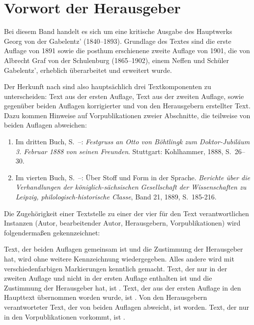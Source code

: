 \chapter*{Vorwort der Herausgeber}

Bei diesem Band handelt es sich um eine kritische Ausgabe des Hauptwerks Georg von der Gabelentz' (1840–1893). Grundlage des Textes sind die erste Auflage von 1891 sowie die posthum erschienene zweite Auflage von 1901, die von Albrecht Graf von der Schulenburg (1865–1902), einem Neffen und Schüler Gabelentz', erheblich überarbeitet und erweitert wurde. 

Der Herkunft nach sind also hauptsächlich drei Textkomponenten zu unterscheiden: Text aus der ersten Auflage, Text aus der zweiten Auflage, sowie gegenüber beiden Auflagen korrigierter und von den Herausgebern erstellter Text. Dazu kommen Hinweise auf Vorpublikationen zweier Abschnitte, die teilweise von beiden Auflagen abweichen:

\begin{enumerate}[1.]
\item Im dritten Buch, S.~\pageref{III.II.II.8}–\pageref{III.II.II.9}: \textit{Festgruss an Otto von Böhtlingk zum Doktor-Jubiläum 3. Februar 1888 von seinen Freunden}. Stuttgart: Kohlhammer, 1888, S.~26–30.
\item Im vierten Buch, S.~\pageref{IV.III.II.1}–\pageref{IV.III.III}: Über Stoff und Form in der Sprache. \textit{Berichte über die Verhandlungen der königlich-sächsischen Gesellschaft der Wissenschaften zu Leipzig, philologisch-historische Classe}, Band 21, 1889, S.~185-216.
\end{enumerate}

Die Zugehörigkeit einer Textstelle zu einer der vier für den Text verantwortlichen Instanzen (Autor, bearbeitender Autor, Herausgebern, Vorpublikationen) wird folgendermaßen gekennzeichnet:

Text, der beiden Auflagen gemeinsam ist und die Zustimmung der Herausgeber hat, wird ohne wei­tere Kennzeichnung wiedergegeben. Alles andere wird mit verschiedenfarbigen Mar­kierungen kenntlich gemacht. Text, der nur in der zweiten Auflage und nicht in der ersten Auflage enthalten ist und die Zustimmung der Herausgeber hat, ist . Text, der aus der ersten Auflage in den Haupttext übernommen worden wurde, ist . Von den Herausgebern verantworteter Text, der von beiden Auflagen abweicht, ist  worden. Text, der nur in den Vorpublikationen vorkommt, ist .

